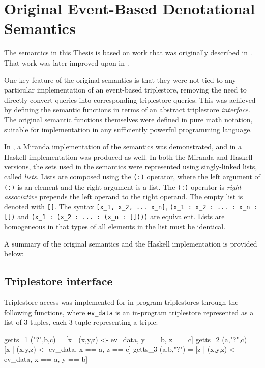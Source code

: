 \documentclass[../main.tex]{subfiles}
\begin{document}
\section{Original Event-Based Denotational Semantics}

The semantics in this Thesis is based on work that was originally described in \cite{frost2013event}.  That work was later improved upon in \cite{frostagboola2014}.

One key feature of the original semantics is that they were not tied to any particular implementation of an event-based triplestore,
removing the need to directly convert queries into corresponding triplestore queries.
This was achieved by defining the semantic functions in terms of an abstract triplestore {\em interface}.
The original semantic functions themselves were defined in pure math notation, suitable for implementation in any sufficiently powerful programming language.

In \cite{frostagboola2014}, a Miranda implementation of the semantics was demonstrated, and in \cite{frost2014denotational} a Haskell
implementation was produced as well.  In both the Miranda and Haskell versions, the sets used in the semantics were represented using
singly-linked lists, called {\em lists}.  Lists are composed using the \texttt{(:)} operator, where the left argument of \texttt{(:)} is an element
and the right argument is a list.  The \texttt{(:)} operator is {\em right-associative} prepends the left operand to the right operand.  The empty list is denoted with
\texttt{[]}.  The syntax \texttt{[x\_1, x\_2, ... x\_n]}, \texttt{(x\_1 : x\_2 : ... : x\_n : [])} and \texttt{(x\_1 : (x\_2 : ... : (x\_n : [])))} are equivalent.
Lists are homogeneous in that types of all elements in the list must be identical.

A summary of the original semantics and the Haskell implementation is provided below:

\subsection{Triplestore interface}

Triplestore access was implemented for in-program triplestores through the following functions, where
\texttt{ev\_data} is an in-program triplestore represented as a list of 3-tuples, each 3-tuple representing a triple:

\begin{code}
	getts_1 ("?",b,c)   = [x | (x,y,z) <- ev_data, y == b, z == c]
	getts_2 (a,"?",c)   = [x | (x,y,z) <- ev_data, x == a, z == c]
	getts_3 (a,b,"?")   = [z | (x,y,z) <- ev_data, x == a, y == b]
\end{code}
\end{document}
